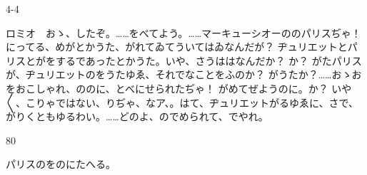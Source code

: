 \documentclass[tate,paper=b6j,jafontsize=9pt]{jlreq}
\begin{document}
\begin{azconvIndented}{4\zw}{-4\zw}

ロミオ　おゝ、したぞ。……をべてよう。……マーキューシオーののパリスぢゃ！ にってる、めがとかうた、がれてゐてういてはゐなんだが？ ヂュリエットとパリスとがをするであったとかうた。いや、さうははなんだか？ か？ がたパリスが、ヂュリエットのをうたゆゑ、それでなことをふのか？ がうたか？……おゝおをおこしゃれ、ののに、とべにせられたぢゃ！ がめてぜようのに。か？ いや{〳〵}、こりゃではない、りぢゃ、なア、。はて、ヂュリエットがるゆゑに、さで、がりくともゆるわい。……どのよ、のでめられて、でやれ。

\end{azconvIndented}
\begin{azconvIndented}{8\zw}{0\zw}

パリスのをのにたへる。

\end{azconvIndented}
\end{document}

